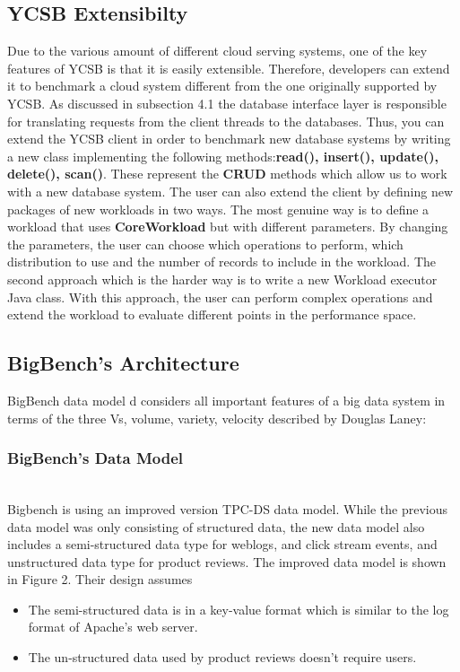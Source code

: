 \documentclass[sigconf,10pt]{acmart}
\begin{document}
\subsection{YCSB Extensibilty}
Due to the various amount of different cloud serving systems, one of the key features of YCSB is that it is easily extensible. Therefore, developers can extend it to benchmark a cloud system different from the one originally supported by YCSB. As discussed in subsection 4.1 the database interface layer is responsible for translating requests from the client threads to the databases. Thus, you can extend the YCSB client  in order to benchmark new database systems   by writing a new class implementing the following methods:\textbf{read(), insert(), update(), delete(), scan()}.
These represent the \textbf{CRUD} methods which allow us to work with a new database system.
The user can also extend the client by defining new packages of new workloads in two ways. The most genuine way is to define a workload that uses \textbf{CoreWorkload} but with different parameters. By changing the parameters, the user can choose which operations to perform, which distribution to use and the number of records to include in the workload.
The second approach which is the harder way is to write a new Workload executor  Java class. With this approach, the user can perform complex operations and extend the workload to evaluate different points in the performance space. 

\subsection{BigBench’s Architecture}
BigBench data model d considers all important features of a big data system in terms of the three Vs, volume, variety, velocity described by Douglas Laney\cite{laney}: 
\newline \newline


\subsubsection{BigBench’s Data Model} \hfill\\
\newline
Bigbench is using an improved version TPC-DS data model. While the previous data model was only consisting of structured data, the new data model also includes a semi-structured data type for weblogs, and click stream events, and unstructured data type for product reviews. The improved data model is shown in Figure 2.
\newline 
Their design assumes
\begin{itemize}
\item The semi-structured data is in a key-value format which is similar to the log format of Apache’s web server.
\item The un-structured data used by product reviews doesn't require users.
\end{itemize}
\end{document}
